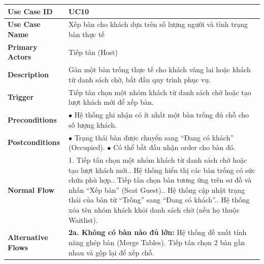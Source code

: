 \begin{longtable}{|p{3.5cm}|p{12.5cm}|}
\hline
\textbf{Use Case ID} & UC10 \\ \hline
\textbf{Use Case Name} & Xếp bàn cho khách dựa trên số lượng người và tình trạng bàn thực tế \\ \hline
\textbf{Primary Actors} & Tiếp tân (Host) \\ \hline
\textbf{Description} & Gán một bàn trống thực tế cho khách vãng lai hoặc khách từ danh sách chờ, bắt đầu quy trình phục vụ. \\ \hline
\textbf{Trigger} & Tiếp tân chọn một nhóm khách từ danh sách chờ hoặc tạo lượt khách mới để xếp bàn. \\ \hline
\textbf{Preconditions} & $\bullet$ Hệ thống ghi nhận có ít nhất một bàn trống đủ chỗ cho số lượng khách. \\ \hline
\textbf{Postconditions} &
$\bullet$ Trạng thái bàn được chuyển sang ``Đang có khách'' (Occupied).\newline
$\bullet$ Có thể bắt đầu nhận order cho bàn đó. \\ \hline
\textbf{Normal Flow} &
1. Tiếp tân chọn một nhóm khách từ danh sách chờ hoặc tạo lượt khách mới.\newline
2. Hệ thống hiển thị các bàn trống có sức chứa phù hợp.\newline
3. Tiếp tân chọn bàn tương ứng trên sơ đồ và nhấn ``Xếp bàn'' (Seat Guest).\newline
4. Hệ thống cập nhật trạng thái của bàn từ ``Trống'' sang ``Đang có khách''.\newline
5. Hệ thống xóa tên nhóm khách khỏi danh sách chờ (nếu họ thuộc Waitlist). \\ \hline
\textbf{Alternative Flows} &
\textbf{2a. Không có bàn nào đủ lớn:} Hệ thống đề xuất tính năng ghép bàn (Merge Tables). Tiếp tân chọn 2 bàn gần nhau và gộp lại để xếp chỗ. \\ \hline
\end{longtable}


